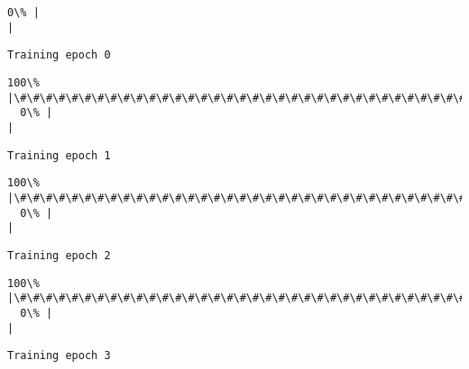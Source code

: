 \documentclass[11pt]{article}
\begin{document}
    \begin{Verbatim}[commandchars=\\\{\}]
  0\% |                                                                        |
    \end{Verbatim}

    \begin{Verbatim}[commandchars=\\\{\}]
Training epoch 0

    \end{Verbatim}

    \begin{Verbatim}[commandchars=\\\{\}]
100\% |\#\#\#\#\#\#\#\#\#\#\#\#\#\#\#\#\#\#\#\#\#\#\#\#\#\#\#\#\#\#\#\#\#\#\#\#\#\#\#\#\#\#\#\#\#\#\#\#\#\#\#\#\#\#\#\#\#\#\#\#\#\#\#\#\#\#\#\#\#\#\#\#|
  0\% |                                                                        |
    \end{Verbatim}

    \begin{Verbatim}[commandchars=\\\{\}]
Training epoch 1

    \end{Verbatim}

    \begin{Verbatim}[commandchars=\\\{\}]
100\% |\#\#\#\#\#\#\#\#\#\#\#\#\#\#\#\#\#\#\#\#\#\#\#\#\#\#\#\#\#\#\#\#\#\#\#\#\#\#\#\#\#\#\#\#\#\#\#\#\#\#\#\#\#\#\#\#\#\#\#\#\#\#\#\#\#\#\#\#\#\#\#\#|
  0\% |                                                                        |
    \end{Verbatim}

    \begin{Verbatim}[commandchars=\\\{\}]
Training epoch 2

    \end{Verbatim}

    \begin{Verbatim}[commandchars=\\\{\}]
100\% |\#\#\#\#\#\#\#\#\#\#\#\#\#\#\#\#\#\#\#\#\#\#\#\#\#\#\#\#\#\#\#\#\#\#\#\#\#\#\#\#\#\#\#\#\#\#\#\#\#\#\#\#\#\#\#\#\#\#\#\#\#\#\#\#\#\#\#\#\#\#\#\#|
  0\% |                                                                        |
    \end{Verbatim}

    \begin{Verbatim}[commandchars=\\\{\}]
Training epoch 3

    \end{Verbatim}
\end{document}
